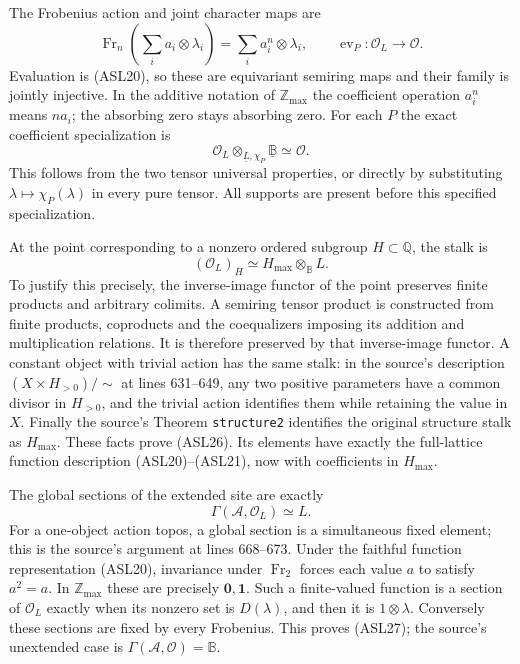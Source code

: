 The Frobenius action and joint character maps are
\begin{equation}\tag{ASL24}
 \operatorname{Fr}_n\left(\sum_i a_i\otimes\lambda_i\right)
       =\sum_i a_i^n\otimes\lambda_i,
 \qquad
 \operatorname{ev}_P:\mathcal O_L\to\mathcal O.
\end{equation}
Evaluation is (ASL20), so these are equivariant semiring maps and
their family is jointly injective. In the additive notation of
$\mathbb Z_{\max}$ the coefficient operation $a_i^n$ means $na_i$;
the absorbing zero stays absorbing zero. For each $P$ the exact
coefficient specialization is
\begin{equation}\tag{ASL25}
 \mathcal O_L\otimes_{\underline L,\chi_P}
           \underline{\mathbb B}\simeq\mathcal O.
\end{equation}
This follows from the two tensor universal properties, or directly
by substituting $\lambda\mapsto\chi_P(\lambda)$ in every pure
tensor. All supports are present before this specified specialization.

At the point corresponding to a nonzero ordered subgroup
$H\subset\mathbb Q$, the stalk is
\begin{equation}\tag{ASL26}
 (\mathcal O_L)_H\simeq H_{\max}\otimes_{\mathbb B}L.
\end{equation}
To justify this precisely, the inverse-image functor of the point
preserves finite products and arbitrary colimits. A semiring tensor
product is constructed from finite products, coproducts and the
coequalizers imposing its addition and multiplication relations.
It is therefore preserved by that inverse-image functor. A constant
object with trivial action has the same stalk: in the source's
description $(X\times H_{>0})/\sim$ at lines 631--649, any two
positive parameters have a common divisor in $H_{>0}$, and the
trivial action identifies them while retaining the value in $X$.
Finally the source's Theorem \texttt{structure2} identifies the
original structure stalk as $H_{\max}$. These facts prove (ASL26).
Its elements have exactly the full-lattice function description
(ASL20)--(ASL21), now with coefficients in $H_{\max}$.

The global sections of the extended site are exactly
\begin{equation}\tag{ASL27}
 \Gamma(\mathscr A,\mathcal O_L)\simeq L.
\end{equation}
For a one-object action topos, a global section is a simultaneous
fixed element; this is the source's argument at lines 668--673.
Under the faithful function representation (ASL20), invariance under
$\operatorname{Fr}_2$ forces each value $a$ to satisfy $a^2=a$.
In $\mathbb Z_{\max}$ these are precisely $\mathbf0,\mathbf1$.
Such a finite-valued function is a section of $\mathcal O_L$ exactly
when its nonzero set is $D(\lambda)$, and then it is
$1\otimes\lambda$. Conversely these sections are fixed by every
Frobenius. This proves (ASL27); the source's unextended case is
$\Gamma(\mathscr A,\mathcal O)=\mathbb B$.

